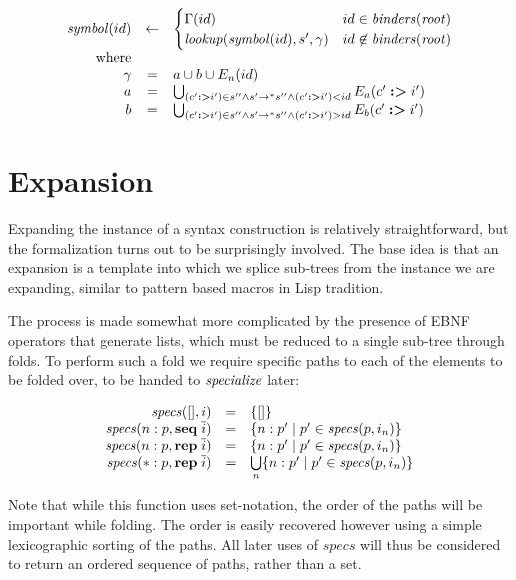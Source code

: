 \documentclass{kththesis}
\begin{document}
$$
\begin{array}{rcl}
\mathit{symbol}(id) & <- &
\begin{cases}
\Gamma(id) & id \in \mathit{binders}(\mathit{root}) \\
\mathit{lookup}(\mathit{symbol}(id), s', \gamma) & id \not\in \mathit{binders}(\mathit{root}) \\
\end{cases} \\
\text{where} & & \\
\gamma & = & a \cup b \cup E_n(id) \\
a & = & \bigcup_{(c' \mathrel{\textbf{:>}} i') \in s'' \land s' ->* s'' \land (c' \mathrel{\textbf{:>}} i') < id} E_a(c' \mathrel{\textbf{:>}} i') \\
b & = & \bigcup_{(c' \mathrel{\textbf{:>}} i') \in s'' \land s' ->* s'' \land (c' \mathrel{\textbf{:>}} i') > id} E_b(c' \mathrel{\textbf{:>}} i') \\
\end{array}
$$

\section{Expansion} \label{sec:expansion-formalization}

Expanding the instance of a syntax construction is relatively straightforward, but the formalization turns out to be surprisingly involved. The base idea is that an expansion is a template into which we splice sub-trees from the instance we are expanding, similar to pattern based macros in Lisp tradition.

The process is made somewhat more complicated by the presence of EBNF operators that generate lists, which must be reduced to a single sub-tree through folds. To perform such a fold we require specific paths to each of the elements to be folded over, to be handed to $\mathit{specialize}$ later:

\newcommand{\specs}{\ensuremath{\mathit{specs}}}

$$
\begin{array}{rcl}
\specs([], i) & = & \{[]\} \\
\specs(n:p, \seq \overline{i}) & = & \{n : p' \mid p' \in \specs(p, i_n)\} \\
\specs(n:p, \repseq \overline{i}) & = & \{n : p' \mid p' \in \specs(p, i_n)\} \\
\specs(*:p, \repseq \overline{i}) & = & \bigcup\limits_{n} \{n:p' \mid p' \in \specs(p, i_n)\} \\
\end{array}
$$

Note that while this function uses set-notation, the order of the paths will be important while folding. The order is easily recovered however using a simple lexicographic sorting of the paths. All later uses of $\specs$ will thus be considered to return an ordered sequence of paths, rather than a set.
\end{document}
